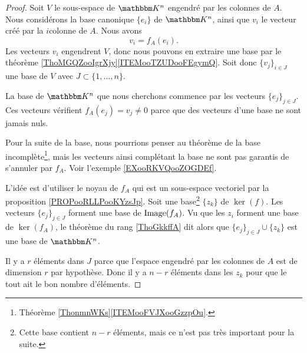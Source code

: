\begin{proof}
    Soit \( V\) le sous-espace de \( \eK^n\) engendré par les colonnes de \( A\). Nous considérons la base canonique \( \{ e_i \}\) de \( \eK^n\), ainsi que \( v_i\) le vecteur créé par la \( i\)\ieme colonne de \( A\). Nous avons
    \begin{equation}
        v_i=f_A(e_i).
    \end{equation}
    Les vecteurs \( v_i\) engendrent \( V\), donc nous pouvons en extraire une base par le théorème \ref{ThoMGQZooIgrXjy}\ref{ITEMooTZUDooFEgymQ}. Soit donc \( \{ v_j \}_{i\in J}\) une base de \( V\) avec \( J\subset\{ 1,\ldots, n \}\).

    La base de \( \eK^n\) que nous cherchons commence par les vecteurs \( \{ e_j \}_{j\in J}\). Ces vecteurs vérifient \( f_A(e_j)=v_j\neq 0\) parce que des vecteurs d'une base ne sont jamais nuls.

    Pour la suite de la base, nous pourrions penser au théorème de la base incomplète\footnote{Théorème \ref{ThonmnWKs}\ref{ITEMooFVJXooGzzpOu}.}, mais les vecteurs ainsi complétant la base ne sont pas garantis de s'annuler par \( f_A\). Voir l'exemple \ref{EXooRKVQooZOGDEf}.

    L'idée est d'utiliser le noyau de \( f_A\) qui est un sous-espace vectoriel par la proposition \ref{PROPooRLLPooKYzsJp}. Soit une base\footnote{Cette base contient \( n-r\) éléments, mais ce n'est pas très important pour la suite.} \(  \{ z_k \}  \) de \( \ker(f)\). Les vecteurs \( \{ e_j \}_{j\in J}\) forment une base de \( \operatorname{Image}(f_A)\). Vu que les \( z_i\) forment une base de \( \ker(f_A)\), le théorème du rang \ref{ThoGkkffA} dit alors que \( \{ e_j \}_{j\in J}\cup \{ z_k \}\) est une base de \( \eK^n\).

    Il y a \( r\) éléments dans \( J\) parce que l'espace engendré par les colonnes de \( A\) est de dimension \( r\) par hypothèse. Donc il y a \( n-r\) éléments dans les \( z_k\) pour que le tout ait le bon nombre d'éléments.
\end{proof}


